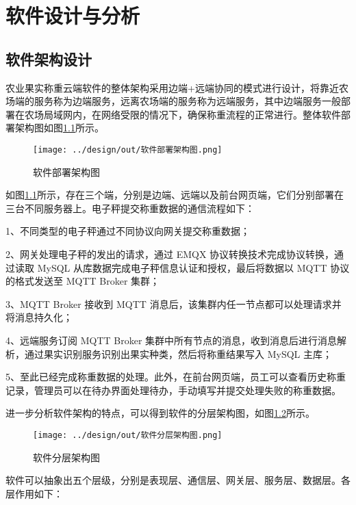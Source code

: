 \chapter{软件设计与分析}

\section{软件架构设计}\label{sec:architecture}

农业果实称重云端软件的整体架构采用边端+远端协同的模式进行设计，将靠近农场端的服务称为边端服务，远离农场端的服务称为远端服务，其中边端服务一般部署在农场局域网内，在网络受限的情况下，确保称重流程的正常进行。整体软件部署架构图如图\ref{fig:软件部署架构图}所示。

\begin{figure}[H]
    \centering
    \texttt{[image: ../design/out/软件部署架构图.png]}
    \caption{软件部署架构图}
    \label{fig:软件部署架构图}
\end{figure}

如图\ref{fig:软件部署架构图}所示，存在三个端，分别是边端、远端以及前台网页端，它们分别部署在三台不同服务器上。电子秤提交称重数据的通信流程如下：

1、不同类型的电子秤通过不同协议向网关提交称重数据；

2、网关处理电子秤的发出的请求，通过 EMQX 协议转换技术完成协议转换，通过读取 MySQL 从库数据完成电子秤信息认证和授权，最后将数据以 MQTT 协议的格式发送至 MQTT Broker 集群；

3、MQTT Broker 接收到 MQTT 消息后，该集群内任一节点都可以处理请求并将消息持久化；

4、远端服务订阅 MQTT Broker 集群中所有节点的消息，收到消息后进行消息解析，通过果实识别服务识别出果实种类，然后将称重结果写入 MySQL 主库；

5、至此已经完成称重数据的处理。此外，在前台网页端，员工可以查看历史称重记录，管理员可以在待办界面处理待办，手动填写并提交处理失败的称重数据。

进一步分析软件架构的特点，可以得到软件的分层架构图，如图\ref{fig:软件分层架构图}所示。

\begin{figure}[H]
    \centering
    \texttt{[image: ../design/out/软件分层架构图.png]}
    \caption{软件分层架构图}
    \label{fig:软件分层架构图}
\end{figure}

软件可以抽象出五个层级，分别是表现层、通信层、网关层、服务层、数据层。各层作用如下：


